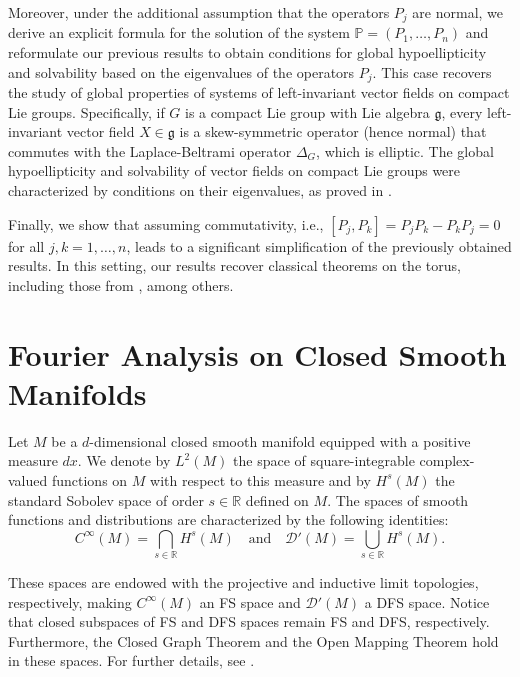 \documentclass{amsart}
\theoremstyle{definition}
\theoremstyle{remark}
\numberwithin{equation}{section}
\begin{document}
	Moreover, under the additional assumption that the operators $P_j$ are normal, we derive an explicit formula for the solution of the system $\mathbb{P}=(P_1,\ldots,P_n)$ and reformulate our previous results to obtain conditions for global hypoellipticity and solvability based on the eigenvalues of the operators $P_j$. This case recovers the study of global properties of systems of left-invariant vector fields on compact Lie groups. Specifically, if $G$ is a compact Lie group with Lie algebra $\mathfrak{g}$, every left-invariant vector field $X\in\mathfrak{g}$ is a skew-symmetric operator (hence normal) that commutes with the Laplace-Beltrami operator $\Delta_G$, which is elliptic. The global hypoellipticity and solvability of vector fields on compact Lie groups were characterized by conditions on their eigenvalues, as proved in \cite{DKP2024arxiv,KMR20,KMR20b}.  
	
	Finally, we show that assuming commutativity, i.e., $[P_j, P_k] = P_jP_k - P_kP_j = 0$ for all $j,k = 1,\dots,n$, leads to a significant simplification of the previously obtained results. In this setting, our results recover classical theorems on the torus, including those from \cite{AKM19,AM2021,BP1999_jmaa,Be1999}, among others.
	


	\section{Fourier Analysis on Closed Smooth Manifolds} \label{overview}
	
	Let $M$ be a $d$-dimensional closed smooth manifold equipped with a positive measure $dx$. We denote by $L^2(M)$ the space of square-integrable complex-valued functions on $M$ with respect to this measure and by $H^s(M)$ the standard Sobolev space of order $s\in\mathbb{R}$ defined on $M$. The spaces of smooth functions and distributions are characterized by the following identities:
	\begin{equation*}\label{sobolev-dx}
		C^\infty(M) = \bigcap_{s \in \mathbb{R}} H^{s}(M) \quad \text{and} \quad {\mathscr{D}'}(M) = \bigcup_{s \in \mathbb{R}} H^{s}(M).
	\end{equation*}
	
	These spaces are endowed with the projective and inductive limit topologies, respectively, making $C^\infty(M)$ an FS space and ${\mathscr{D}'}(M)$ a DFS space. Notice that closed subspaces of FS and DFS spaces remain FS and DFS, respectively. Furthermore, the Closed Graph Theorem and the Open Mapping Theorem hold in these spaces. For further details, see \cite{Komatsu1967,kothe_TVS}.
	
\end{document}
